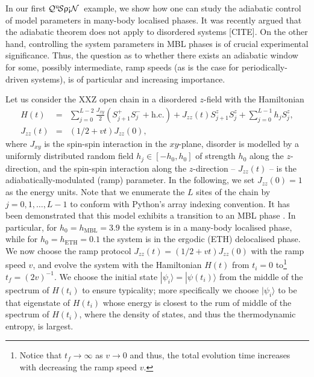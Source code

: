 \documentclass{SciPost}
\newcommand\0{\scalebox{-1}[1]{0}}
\newcommand{\qspin}{$\mathcal{Q}^{\mathrm{u}}\!\mathcal{S}\uprho\mathrm{\text{\textexclamdown}}\mathcal{N}$}
\begin{document}
In our first \qspin\ example, we show how one can study the adiabatic control of model parameters in many-body localised phases. It was recently argued that the adiabatic theorem does not apply to disordered systems [CITE]. On the other hand, controlling the system parameters in MBL phases is of crucial experimental\cite{Schreiber15} significance. Thus, the question as to whether there exists an adiabatic window for some, possibly intermediate, ramp speeds (as is the case for periodically-driven systems\cite{weinberg_FAPT}), is of particular and increasing importance. 

Let us consider the XXZ open chain in a disordered $z$-field with the Hamiltonian
\begin{eqnarray}
H(t) &=& \sum_{j=0}^{L-2}\frac{J_{xy}}{2}\left(S^+_{j+1}S^-_{j} + \mathrm{h.c.}\right) + J_{zz}(t)S^z_{j+1}S^z_{j} + \sum_{j=0}^{L-1}h_jS^z_{j},\nonumber\\
J_{zz}(t) &=&(1/2 + vt)J_{zz}(0),
\label{eq:H_XXZ}
\end{eqnarray}
where $J_{xy}$ is the spin-spin interaction in the $xy$-plane, disorder is modelled by a uniformly distributed random field $h_j\in[-h_0,h_0]$ of strength $h_0$ along the $z$-direction, and the spin-spin interaction along the $z$-direction -- $J_{zz}(t)$ -- is the adiabatically-modulated (ramp) parameter. In the following, we set $J_{zz}(0) = 1$ as the energy units. Note that we enumerate the $L$ sites of the chain by $j = 0,1,\dots, L-1$ to conform with Python's array indexing convention. It has been demonstrated that this model exhibits a transition to an MBL phase \cite{Luitz15}. In particular, for $h_0=h_\mathrm{MBL}=3.9$ the system is in a many-body localised phase, while for $h_0=h_\mathrm{ETH}=0.1$ the system is in the ergodic (ETH) delocalised phase. We now choose the ramp protocol $J_{zz}(t)=(1/2 + vt)J_{zz}(0)$ with the ramp speed $v$, and evolve the system with the Hamiltonian $H(t)$ from $t_i=0$ to\footnote{Notice that $t_f\to\infty$ as $v\to 0$ and thus, the total evolution time increases with decreasing the ramp speed $v$.} $t_f=(2v)^{-1}$. We choose the initial state $|\psi_i\rangle=|\psi(t_i)\rangle$ from the middle of the spectrum of $H(t_i)$ to ensure typicality; more specifically we choose $|\psi_i\rangle$ to be that eigenstate of $H(t_i)$ whose energy is closest to the rum of middle of the spectrum of $H(t_i)$, where the density of states, and thus the thermodynamic entropy, is largest.  
\end{document}
